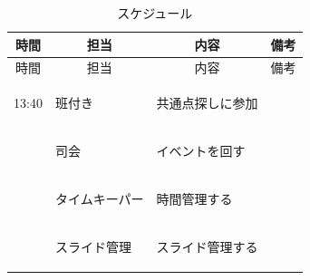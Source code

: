 \begin{longtable}[c]{|p{}|p{}|p{}|p{}|}
  \caption{スケジュール} \\
  \hline
  \multicolumn{1}{|c|}{時間} & \multicolumn{1}{c|}{担当} & \multicolumn{1}{c|}{内容} & \multicolumn{1}{c|}{備考} \\
  \hline
  \endfirsthead
  
  \hline
  \multicolumn{1}{|c|}{時間} & \multicolumn{1}{c|}{担当} & \multicolumn{1}{c|}{内容} & \multicolumn{1}{c|}{備考} \\
  \hline
  \endhead
  
  \hline
  \endfoot
  
  \hline
  \endlastfoot
  
  \begin{tpacol}
    13:40
  \end{tpacol}&
  \begin{tpbcol}
    班付き
  \end{tpbcol}&
  \begin{tpccol}
    共通点探しに参加
  \end{tpccol}&
  \begin{tpdcol}
  \end{tpdcol}\\

  \begin{tpacol}
    
  \end{tpacol}&
  \begin{tpbcol}
    司会
  \end{tpbcol}&
  \begin{tpccol}
    イベントを回す
  \end{tpccol}&
  \begin{tpdcol}
  \end{tpdcol}\\

  \begin{tpacol}
    
  \end{tpacol}&
  \begin{tpbcol}
    タイムキーパー
  \end{tpbcol}&
  \begin{tpccol}
    時間管理する
  \end{tpccol}&
  \begin{tpdcol}
  \end{tpdcol} \\

  \begin{tpacol}
    
  \end{tpacol}&
  \begin{tpbcol}
    スライド管理
  \end{tpbcol}&
  \begin{tpccol}
    スライド管理する
  \end{tpccol}&
  \begin{tpdcol}
  \end{tpdcol} \\

\end{longtable}
\normalsize

